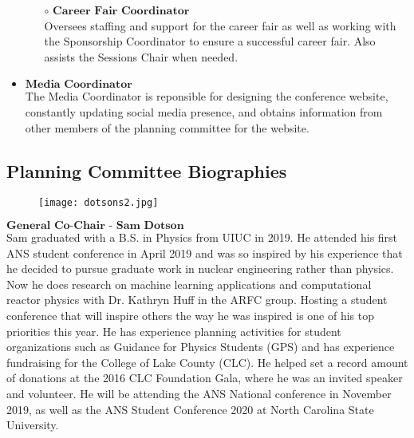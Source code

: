 \begin{itemize}
\begin{itemize}
		\item[$\circ$] $\textbf{Career Fair Coordinator}$\\
		Oversees staffing and support for the career fair as well as working with the Sponsorship
		Coordinator to ensure a successful career fair. Also assists the Sessions Chair when needed.
	\end{itemize}
	\item $\textbf{Media Coordinator}$\\
		The Media Coordinator is reponsible for designing the conference website, constantly updating social media presence,
		and obtains information from other members of the planning committee for the website. 
\end{itemize}

\newpage
\subsection{Planning Committee Biographies}

\setlength\intextsep{0pt}
\begin{wrapfigure}{L}{0.35\textwidth}
	\begin{center}
		\vspace{-\baselineskip}
		\texttt{[image: dotsons2.jpg]}
	\end{center}
\end{wrapfigure}
$\textbf{General Co-Chair - Sam Dotson}$\\
Sam graduated with a B.S. in Physics from UIUC in 2019. He attended his first ANS student conference in April 2019 and was so inspired by his experience that he decided to pursue graduate work in nuclear engineering rather than physics. Now he does research on machine learning applications and computational reactor physics with Dr. Kathryn Huff in the ARFC group. Hosting a student conference that will inspire others the way he was inspired is one of his top priorities this year. He has experience planning activities for student organizations such as Guidance for Physics Students (GPS) and has experience fundraising for the College of Lake County (CLC). He helped set a record amount of donations at the 2016 CLC Foundation Gala, where he was an invited speaker and volunteer. He will be attending the ANS National conference in November 2019, as well as the ANS Student Conference 2020 at North Carolina State University.\\

